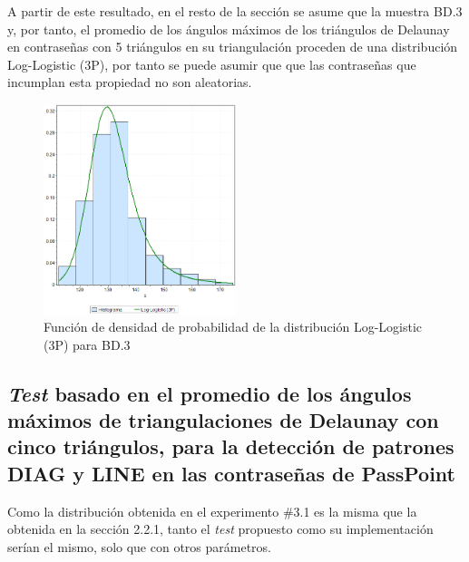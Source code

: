\documentclass[12pt]{report}
\begin{document}
A partir de este resultado, en el resto de la sección se asume que la muestra  BD.3 y, por tanto, el promedio de los ángulos máximos de los triángulos de Delaunay en contraseñas con 5 triángulos en su triangulación  proceden de una distribución Log-Logistic (3P), por tanto se puede asumir que que las contraseñas que incumplan esta propiedad no son aleatorias.
\begin{figure}[ht]
	\centering
	
	\includegraphics[width=0.5\textwidth]{5td_fdp.png}
	\caption{Función de densidad de probabilidad de la  distribución Log-Logistic (3P) para BD.3}
	\label{5TD_FDP}
\end{figure}

\newpage
\subsection{\textit{Test} basado en el promedio de los ángulos máximos de triangulaciones de Delaunay con cinco triángulos, para la detección de patrones DIAG y LINE en las contraseñas de PassPoint}
Como la distribución   obtenida en el experimento \#3.1 es la misma que la obtenida en la sección 2.2.1, tanto el \textit{test} propuesto como su implementación  serían el mismo, solo que con otros parámetros.

\end{document}
